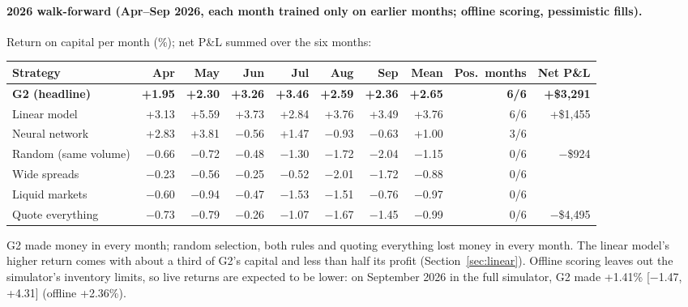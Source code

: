 \documentclass[11pt,a4paper]{article}
\newcommand{\pos}[1]{\textcolor{green!45!black}{#1}}
\newcommand{\negv}[1]{\textcolor{red!65!black}{#1}}
\begin{document}
\paragraph{2026 walk-forward (Apr--Sep 2026, each month trained only on earlier months; offline scoring,
pessimistic fills).} Return on capital per month (\%); net P\&L summed over the six months:
\begin{center}
\small\setlength{\tabcolsep}{3.6pt}
\begin{tabular}{@{}lrrrrrrrrr@{}}
\toprule
Strategy & Apr & May & Jun & Jul & Aug & Sep & Mean & Pos.\ months & Net P\&L \\
\midrule
\textbf{G2 (headline)} & \textbf{+1.95} & \textbf{+2.30} & \textbf{+3.26} & \textbf{+3.46} & \textbf{+2.59} & \textbf{+2.36} & \pos{\textbf{+2.65}} & \textbf{6/6} & \pos{\textbf{+\$3,291}} \\
Linear model & +3.13 & +5.59 & +3.73 & +2.84 & +3.76 & +3.49 & \pos{+3.76} & 6/6 & \pos{+\$1,455} \\
Neural network & +2.83 & +3.81 & $-$0.56 & +1.47 & $-$0.93 & $-$0.63 & \pos{+1.00} & 3/6 & \\
Random (same volume) & $-$0.66 & $-$0.72 & $-$0.48 & $-$1.30 & $-$1.72 & $-$2.04 & \negv{$-$1.15} & 0/6 & \negv{$-$\$924} \\
Wide spreads & $-$0.23 & $-$0.56 & $-$0.25 & $-$0.52 & $-$2.01 & $-$1.72 & \negv{$-$0.88} & 0/6 & \\
Liquid markets & $-$0.60 & $-$0.94 & $-$0.47 & $-$1.53 & $-$1.51 & $-$0.76 & \negv{$-$0.97} & 0/6 & \\
Quote everything & $-$0.73 & $-$0.79 & $-$0.26 & $-$1.07 & $-$1.67 & $-$1.45 & \negv{$-$0.99} & 0/6 & \negv{$-$\$4,495} \\
\bottomrule
\end{tabular}
\end{center}
G2 made money in every month; random selection, both rules and quoting everything lost money in every month. The
linear model's higher return comes with about a third of G2's capital and less than half its profit
(Section~\ref{sec:linear}). Offline scoring leaves out the simulator's inventory limits, so live returns are
expected to be lower: on September 2026 in the full simulator, G2 made +1.41\% [$-$1.47, +4.31] (offline +2.36\%).
\end{document}
